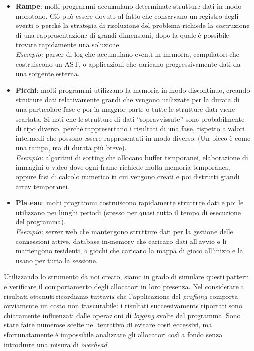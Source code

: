 \begin{itemize}
  \item \textbf{Rampe}: molti programmi accumulano determinate strutture dati in modo monotono. Ciò può essere dovuto al fatto che conservano un registro degli eventi o perché la strategia di risoluzione del problema richiede la costruzione di una rappresentazione di grandi dimensioni, dopo la quale è possibile trovare rapidamente una soluzione.\\
  \textit{Esempio:} parser di log che accumulano eventi in memoria, compilatori che costruiscono un AST, o applicazioni che caricano progressivamente dati da una sorgente esterna.

  \item \textbf{Picchi}: molti programmi utilizzano la memoria in modo discontinuo, creando strutture dati relativamente grandi che vengono utilizzate per la durata di una particolare fase e poi la maggior parte o tutte le strutture dati viene scartata. Si noti che le strutture di dati “sopravvissute” sono probabilmente di tipo diverso, perché rappresentano i risultati di una fase, rispetto a valori intermedi che possono essere rappresentati in modo diverso. (Un picco è come una rampa, ma di durata più breve).\\
  \textit{Esempio:} algoritmi di sorting che allocano buffer temporanei, elaborazione di immagini o video dove ogni frame richiede molta memoria temporanea, oppure fasi di calcolo numerico in cui vengono creati e poi distrutti grandi array temporanei.

  \item \textbf{Plateau}: molti programmi costruiscono rapidamente strutture dati e poi le utilizzano per lunghi periodi (spesso per quasi tutto il tempo di esecuzione del programma).\\
  \textit{Esempio:} server web che mantengono strutture dati per la gestione delle connessioni attive, database in-memory che caricano dati all’avvio e li mantengono residenti, o giochi che caricano la mappa di gioco all’inizio e la usano per tutta la sessione.
\end{itemize}

Utilizzando lo strumento da noi creato, siamo in grado di simulare questi pattern e verificare il comportamento degli allocatori in loro presenza. Nel considerare i risultati ottenuti ricordiamo tuttavia che l'applicazione del \textit{profiling} comporta ovviamente un costo non trascurabile: i risultati successivamente riportati sono chiaramente influenzati dalle operazioni di \textit{logging} svolte dal programma. Sono state fatte numerose scelte nel tentativo di evitare costi eccessivi, ma sfortunatamente è impossibile analizzare gli allocatori così a fondo senza introdurre una misura di \textit{overhead}.

